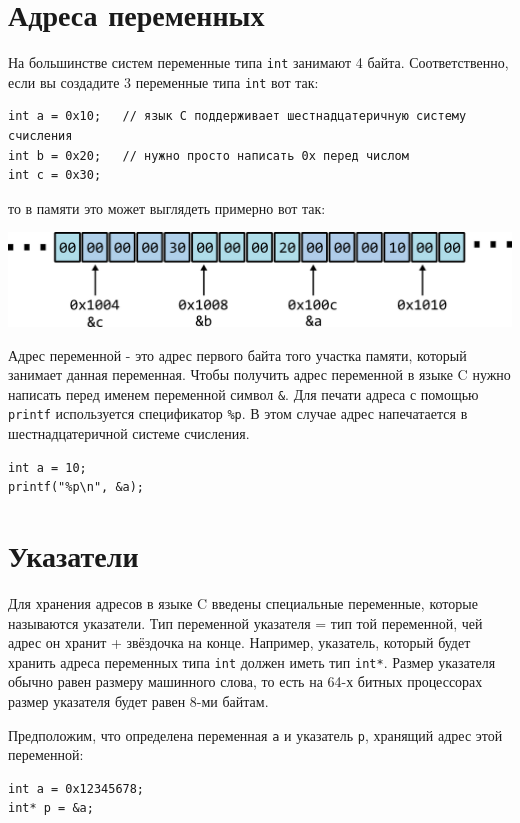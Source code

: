 \documentclass[10pt]{article}
\begin{document}
\section*{Адреса переменных}
На большинстве систем переменные типа \texttt{int} занимают 4 байта. Соответственно, если вы создадите 3 переменные типа \texttt{int} вот так:
\begin{lstlisting}
int a = 0x10;   // язык C поддерживает шестнадцатеричную систему счисления
int b = 0x20;   // нужно просто написать 0x перед числом
int c = 0x30;
\end{lstlisting}
то в памяти это может выглядеть примерно вот так:
\begin{center}
\includegraphics[scale=1]{../images/memory2.png}
\end{center}

Адрес переменной - это адрес первого байта того участка памяти, который занимает данная переменная.
Чтобы получить адрес переменной в языке C нужно написать перед именем переменной символ \texttt{\&}.
Для печати адреса с помощью \texttt{printf} используется спецификатор \texttt{\%p}. 
В этом случае адрес напечатается в шестнадцатеричной системе счисления.
\begin{lstlisting}
int a = 10;
printf("%p\n", &a);
\end{lstlisting}


\section*{Указатели}
Для хранения адресов в языке C введены специальные переменные, которые называются указатели. Тип переменной указателя = тип той переменной, чей адрес он хранит + звёздочка на конце. Например, указатель, который будет хранить адреса переменных типа \texttt{int} должен иметь тип \texttt{int*}. Размер указателя обычно равен размеру машинного слова, то есть на 64-х битных процессорах размер указателя будет равен 8-ми байтам.

Предположим, что определена переменная \texttt{a} и указатель \texttt{p}, хранящий адрес этой переменной:
\begin{lstlisting}
int a = 0x12345678;
int* p = &a;
\end{lstlisting}
\end{document}
